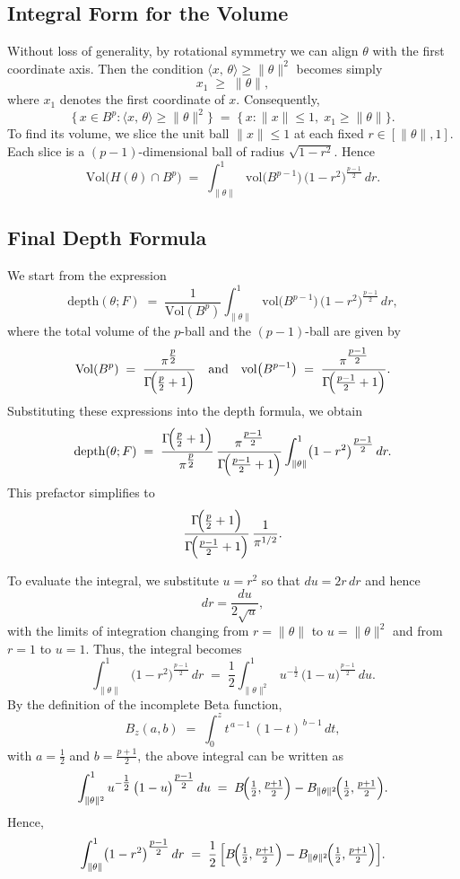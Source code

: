 \subsection{Integral Form for the Volume}

Without loss of generality, by rotational symmetry we can align \(\theta\) with the first coordinate axis. 
Then the condition \(\langle x,\,\theta\rangle \ge \|\theta\|^2\) becomes simply 
\[
x_1 \;\ge\; \|\theta\|,
\]
where \(x_1\) denotes the first coordinate of \(x\). Consequently,
\[
\bigl\{\,x \in B^p : \langle x,\,\theta\rangle \ge \|\theta\|^2\bigr\}
\;=\;
\{\,x : \|x\|\le 1,\; x_1 \ge \|\theta\|\}.
\]
To find its volume, we slice the unit ball \(\|x\|\le 1\) at each fixed \(r \in [\|\theta\|,1]\). 
Each slice is a \((p-1)\)-dimensional ball of radius \(\sqrt{1-r^2}\). Hence
\[
\mathrm{Vol}\bigl(H(\theta)\cap B^p\bigr)
\;=\;
\int_{\|\theta\|}^{1} 
\mathrm{vol}\bigl(B^{p-1}\bigr)\,\bigl(1-r^2\bigr)^{\tfrac{p-1}{2}}\,dr.
\]

\subsection{Final Depth Formula}

We start from the expression
\[
\mathrm{depth}(\theta;F) 
\;=\;
\frac{1}{\mathrm{Vol}(B^p)}
\int_{\|\theta\|}^{1}
\mathrm{vol}\bigl(B^{p-1}\bigr)\,\bigl(1 - r^2\bigr)^{\tfrac{p-1}{2}}\,dr,
\]
where the total volume of the \(p\)-ball and the \((p-1)\)-ball are given by
\[
\mathrm{Vol}(B^p)
\;=\;
\frac{\pi^{\tfrac{p}{2}}}{\Gamma\!\Bigl(\tfrac{p}{2}+1\Bigr)}
\quad\text{and}\quad
\mathrm{vol}\bigl(B^{p-1}\bigr)
\;=\;
\frac{\pi^{\tfrac{p-1}{2}}}{\Gamma\!\Bigl(\tfrac{p-1}{2}+1\Bigr)}.
\]
Substituting these expressions into the depth formula, we obtain
\[
\mathrm{depth}(\theta;F)
\;=\;
\frac{\Gamma\!\Bigl(\tfrac{p}{2}+1\Bigr)}{\pi^{\tfrac{p}{2}}}\,
\frac{\pi^{\tfrac{p-1}{2}}}{\Gamma\!\Bigl(\tfrac{p-1}{2}+1\Bigr)}
\int_{\|\theta\|}^{1}
\bigl(1 - r^2\bigr)^{\tfrac{p-1}{2}}\,dr.
\]
This prefactor simplifies to
\[
\frac{\Gamma\!\Bigl(\tfrac{p}{2}+1\Bigr)}{\Gamma\!\Bigl(\tfrac{p-1}{2}+1\Bigr)}\,\frac{1}{\pi^{1/2}}.
\]

To evaluate the integral, we substitute \(u=r^2\) so that \(du=2r\,dr\) and hence
\[
dr = \frac{du}{2\sqrt{u}},
\]
with the limits of integration changing from \(r=\|\theta\|\) to \(u=\|\theta\|^2\) and from \(r=1\) to \(u=1\). Thus, the integral becomes
\[
\int_{\|\theta\|}^{1}
\bigl(1 - r^2\bigr)^{\tfrac{p-1}{2}}\,dr
\;=\;
\frac{1}{2}
\int_{\|\theta\|^2}^{1}
u^{-\tfrac{1}{2}}\,\bigl(1 - u\bigr)^{\tfrac{p-1}{2}}\,du.
\]
By the definition of the incomplete Beta function,
\[
B_{z}(a,b)
\;=\;
\int_{0}^{z}
t^{\,a-1}\,(1-t)^{\,b-1}\,dt,
\]
with \(a=\tfrac{1}{2}\) and \(b=\tfrac{p+1}{2}\), the above integral can be written as
\[
\int_{\|\theta\|^2}^{1}
u^{-\tfrac{1}{2}}\,\bigl(1 - u\bigr)^{\tfrac{p-1}{2}}\,du
\;=\;
B\!\Bigl(\tfrac{1}{2},\tfrac{p+1}{2}\Bigr)
-
B_{\|\theta\|^2}\!\Bigl(\tfrac{1}{2},\tfrac{p+1}{2}\Bigr).
\]
Hence,
\[
\int_{\|\theta\|}^{1}
\bigl(1 - r^2\bigr)^{\tfrac{p-1}{2}}\,dr
\;=\;
\frac{1}{2}\,
\Bigl[
B\!\Bigl(\tfrac{1}{2},\tfrac{p+1}{2}\Bigr)
-
B_{\|\theta\|^2}\!\Bigl(\tfrac{1}{2},\tfrac{p+1}{2}\Bigr)
\Bigr].
\]


